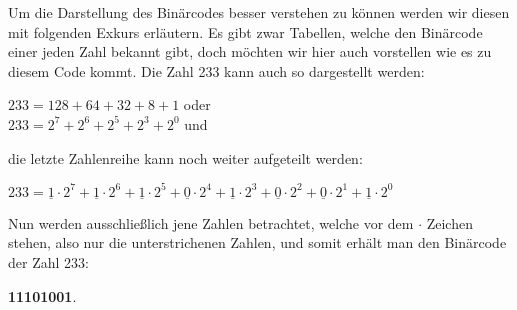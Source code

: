 \documentclass[12pt,a4paper]{article}
\theoremstyle{definition}
\begin{document}
Um die Darstellung des Binärcodes besser verstehen zu können werden wir diesen mit folgenden Exkurs erläutern.
\label{Binärcode der Zahl 233} Es gibt zwar Tabellen, welche den Binärcode einer jeden Zahl bekannt gibt, doch möchten wir hier auch vorstellen wie es zu diesem Code kommt.
Die Zahl 233 kann auch so dargestellt werden:
\begin{center}
$233 = 128 + 64 + 32 + 8 + 1$ oder \\
$233 = 2^7 + 2^6 + 2^5 + 2^3 + 2^0$ und \\
\end{center}
die letzte Zahlenreihe kann noch weiter aufgeteilt werden:
\begin{center}
$233 = \underline{1} \cdot 2^7 + \underline{1} \cdot 2^6 + \underline{1} \cdot 2^5 + \underline{0} \cdot2^4 + \underline{1} \cdot 2^3 + \underline{0} \cdot2^2 + \underline{0} \cdot 2^1 + \underline{1} \cdot 2^0$
\end{center}
Nun werden ausschließlich jene Zahlen betrachtet, welche vor dem $\cdot$ Zeichen stehen, also nur die unterstrichenen Zahlen, und somit erhält man den Binärcode der Zahl 233:
\begin{center}
\textbf{11101001}.
\end{center}
\end{document}
